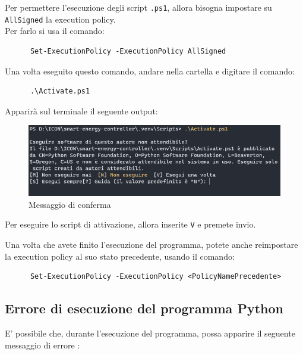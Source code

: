 \documentclass[12pt, letterpaper]{article}
\begin{document}
\noindent Per permettere l'esecuzione degli script \texttt{.ps1}, allora bisogna impostare
su \texttt{AllSigned} la execution policy. \\
\noindent Per farlo si usa il comando: \\

\begin{verbatim}
      Set-ExecutionPolicy -ExecutionPolicy AllSigned
\end{verbatim}

Una volta eseguito questo comando, andare nella cartella  e digitare il
comando:

\begin{verbatim}
      .\Activate.ps1
\end{verbatim}

Apparirà sul terminale il seguente output: \\

\begin{figure}[h]
      \centering
      \includegraphics[scale=0.6]{terminal-message.png}
      \caption{Messaggio di conferma}
\end{figure}

Per eseguire lo script di attivazione, allora inserite \texttt{V} e
premete invio. \\ \break

\noindent Una volta che avete finito l'esecuzione del programma, potete anche reimpostare
la execution policy al suo stato precedente, usando il comando:

\begin{verbatim}
      Set-ExecutionPolicy -ExecutionPolicy <PolicyNamePrecedente>
\end{verbatim}


\subsection{Errore di esecuzione del programma Python}
\label{sec:python-error}

E' possibile che, durante l'esecuzione del programma, possa apparire il seguente
messaggio di errore \cite{python-mapping-problem}: \\ \pagebreak
\end{document}
